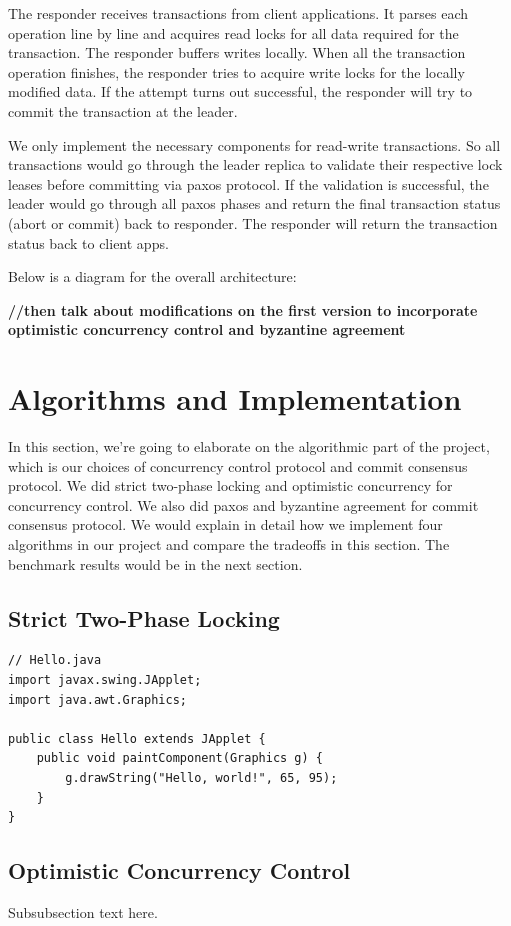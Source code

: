 \documentclass[10pt,twocolumn]{article}
\begin{document}
The responder receives transactions from client applications. It parses each operation line by line and acquires read locks for all data required for the transaction. The responder buffers writes locally. When all the transaction operation finishes, the responder tries to acquire write locks for the locally modified data. If the attempt turns out successful, the responder will try to commit the transaction at the leader. 

We only implement the necessary components for read-write transactions. So all transactions would go through the leader replica to validate their respective lock leases before committing via paxos protocol. If the validation is successful, the leader would go through all paxos phases and return the final transaction status (abort or commit) back to responder. The responder will return the transaction status back to client apps.

Below is a diagram for the overall architecture:

\textbf{//then talk about modifications on the first version to incorporate optimistic concurrency control and byzantine agreement}


\section{Algorithms and Implementation}
In this section, we're going to elaborate on the algorithmic part of the project, which is our choices of concurrency control protocol and commit consensus protocol. We did strict two-phase locking and optimistic concurrency for concurrency control. We also did paxos and byzantine agreement for commit consensus protocol. We would explain in detail how we implement four algorithms in our project and compare the tradeoffs in this section. The benchmark results would be in the next section.

\subsection{Strict Two-Phase Locking}
\begin{lstlisting}
// Hello.java
import javax.swing.JApplet;
import java.awt.Graphics;

public class Hello extends JApplet {
    public void paintComponent(Graphics g) {
        g.drawString("Hello, world!", 65, 95);
    }    
}
\end{lstlisting}

\subsection{Optimistic Concurrency Control}
Subsubsection text here.
\end{document}
